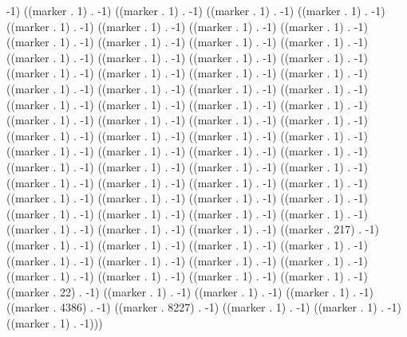 -1) ((marker . 1) . -1) ((marker . 1) . -1) ((marker . 1) . -1) ((marker . 1) . -1) ((marker . 1) . -1) ((marker . 1) . -1) ((marker . 1) . -1) ((marker . 1) . -1) ((marker . 1) . -1) ((marker . 1) . -1) ((marker . 1) . -1) ((marker . 1) . -1) ((marker . 1) . -1) ((marker . 1) . -1) ((marker . 1) . -1) ((marker . 1) . -1) ((marker . 1) . -1) ((marker . 1) . -1) ((marker . 1) . -1) ((marker . 1) . -1) ((marker . 1) . -1) ((marker . 1) . -1) ((marker . 1) . -1) ((marker . 1) . -1) ((marker . 1) . -1) ((marker . 1) . -1) ((marker . 1) . -1) ((marker . 1) . -1) ((marker . 1) . -1) ((marker . 1) . -1) ((marker . 1) . -1) ((marker . 1) . -1) ((marker . 1) . -1) ((marker . 1) . -1) ((marker . 1) . -1) ((marker . 1) . -1) ((marker . 1) . -1) ((marker . 1) . -1) ((marker . 1) . -1) ((marker . 1) . -1) ((marker . 1) . -1) ((marker . 1) . -1) ((marker . 1) . -1) ((marker . 1) . -1) ((marker . 1) . -1) ((marker . 1) . -1) ((marker . 1) . -1) ((marker . 1) . -1) ((marker . 1) . -1) ((marker . 1) . -1) ((marker . 1) . -1) ((marker . 1) . -1) ((marker . 1) . -1) ((marker . 1) . -1) ((marker . 1) . -1) ((marker . 1) . -1) ((marker . 1) . -1) ((marker . 1) . -1) ((marker . 1) . -1) ((marker . 217) . -1) ((marker . 1) . -1) ((marker . 1) . -1) ((marker . 1) . -1) ((marker . 1) . -1) ((marker . 1) . -1) ((marker . 1) . -1) ((marker . 1) . -1) ((marker . 1) . -1) ((marker . 1) . -1) ((marker . 1) . -1) ((marker . 1) . -1) ((marker . 1) . -1) ((marker . 22) . -1) ((marker . 1) . -1) ((marker . 1) . -1) ((marker . 1) . -1) ((marker . 4386) . -1) ((marker . 8227) . -1) ((marker . 1) . -1) ((marker . 1) . -1) ((marker . 1) . -1)))

